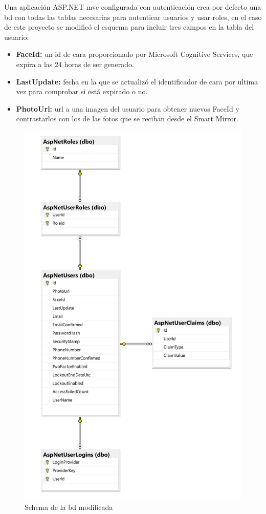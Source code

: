 Una aplicación ASP.NET \acrshort{mvc} configurada con autenticación crea por defecto una \acrshort{bd} con todas las tablas necesarias para autenticar usuarios y usar roles, en el caso de este proyecto se modificó el esquema para incluir tres campos en la tabla del usuario:

\begin{itemize}
\item \textbf{FaceId:} un id de cara proporcionado por Microsoft Cognitive Services, que expira a las 24 horas de ser generado.
\item \textbf{LastUpdate:} fecha en la que se actualizó el identificador de cara por ultima vez para comprobar si está expirado o no.
\item \textbf{PhotoUrl:} \acrshort{url} a una imagen del usuario para obtener nuevos FaceId y contrastarlos con los de las fotos que se reciban desde el Smart Mirror.
\end{itemize}

\begin{figure}[!htp]
	\centering
	\includegraphics[angle=0, page=1, scale=.3]{fig/schema}
	\caption{Schema de la \acrshort{bd} modificada}
\end{figure}

\FloatBarrier
